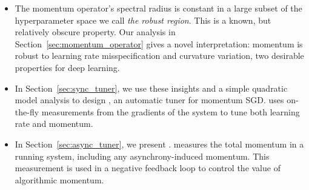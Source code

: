 \begin{itemize}[leftmargin=2em]
\item
The momentum operator's spectral radius is constant in a large subset of the hyperparameter space we call {\em the robust region}.
This is a known, but relatively obscure property.
Our analysis in Section~\ref{sec:momentum_operator} gives a novel interpretation:
momentum is robust to learning rate misspecification and curvature variation,
two desirable properties for deep learning.
\item
In Section~\ref{sec:sync_tuner}, we use these insights and a simple quadratic model analysis to design \tuner, an automatic tuner for momentum SGD.
\tuner uses on-the-fly measurements from the gradients of the system to tune both learning rate and momentum.
\item In Section~\ref{sec:async_tuner}, we present \asynctuner 
.
 measures the total momentum in a running system, including any asynchrony-induced momentum. 
This measurement is used in a negative feedback loop to control the value of algorithmic momentum.%


\end{itemize}
